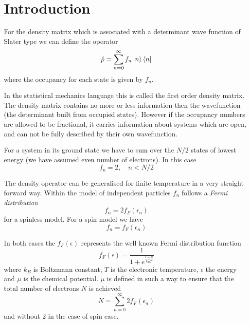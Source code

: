 \section{Introduction}
\par{For the density matrix which is associated with a determinant wave function of Slater type
we can define the operator}
\begin{equation}
{\hat\rho}=\sum_{n=0}^{\infty}f_n\mathinner{|{n}\rangle}\mathinner{\langle{n}|}
\end{equation}
where the occupancy for each state is given by $f_n$.
\par{In the statistical mechanics language this is called the first order
density matrix. The density matrix contains no more or less information
then the wavefunction (the determinant built from occupied states).
However if the occupancy numbers are allowed to be fractional, it carries information
about systems which are open, and can not be fully described by their own wavefunction.}
\par{For a system in its ground state we have to sum over the $N/2$ states of lowest energy
(we have assumed even number of electrons). In this case }
\begin{equation}
f_n=2, \quad n<N/2
\end{equation}
\par{The density operator can be generalised for finite temperature in a very straight forward way. Within the
model of independent particles $f_n$ follows a \emph {Fermi distribution}}
\begin{equation}
f_{n}=2f_F(\epsilon_n)
\end{equation}
for a spinless model. For a spin model we have
\begin{equation}
f_{n}=f_F(\epsilon_n)
\end{equation}
\par{In both cases the $f_F(\epsilon)$ represents the well known Fermi distribution function}
\begin{equation}
\label{fermidistribution}
f_F(\epsilon)=\frac{1}{1+e^{\frac{\epsilon-\mu}{k_BT}}}
\end{equation}
where $k_B$ is Boltzmann constant, $T$ is the electronic temperature, $\epsilon$ the energy
and $\mu$ is the chemical potential. $\mu$ is defined in such a way to ensure that
the total number of electrons $N$ is achieved
\begin{equation}
N=\sum_{n=0}^{\infty}2f_F(\epsilon_n)
\end{equation}
and without $2$ in the case of spin case.
